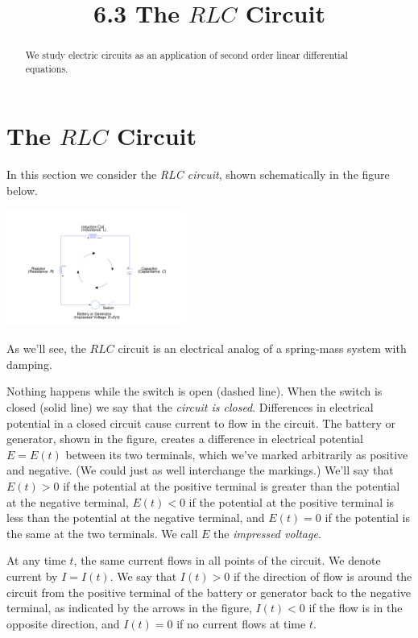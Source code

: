 \documentclass{ximera}
\title{6.3 The $RLC$ Circuit}
\begin{document}
\begin{abstract}
We study electric circuits as an application of second order linear differential equations.
\end{abstract}

\maketitle

\section*{The $RLC$ Circuit}

In this section we consider the \textit{RLC circuit}, shown
schematically in the figure below. 

\begin{image}
  \includegraphics[height=1.5in]{fig060301.jpg} 
\end{image}

As we'll see, the $RLC$
circuit is an electrical analog of a spring-mass system with
damping.

Nothing happens while the switch is open (dashed line). When the
switch is closed (solid line) we say that the \textit{circuit is closed}. Differences in electrical potential in a closed circuit
cause current to flow in the circuit. The battery or generator, shown in the figure,
 creates a difference in electrical potential
$E=E(t)$ between its two terminals, which we've marked arbitrarily as
positive and negative. (We could just as well interchange the
markings.) We'll say that $E(t)>0$ if the potential at the positive
terminal is greater than the potential at the negative terminal,
$E(t)<0$ if the potential at the positive terminal is less than the
potential at the negative terminal, and $E(t)=0$ if the potential is
the same at the two terminals. We call $E$ the \textit{impressed
voltage}.

At any  time $t$, the same current flows in all points of the
circuit. We denote current by $I=I(t)$. We say that $I(t)>0$ if the
direction of flow is around the circuit from the positive terminal of
the battery or generator back to the negative terminal, as indicated
by the arrows in the figure,   $I(t)<0$ if the flow is in the
opposite direction, and $I(t)=0$ if no current flows at time $t$.
\end{document}
